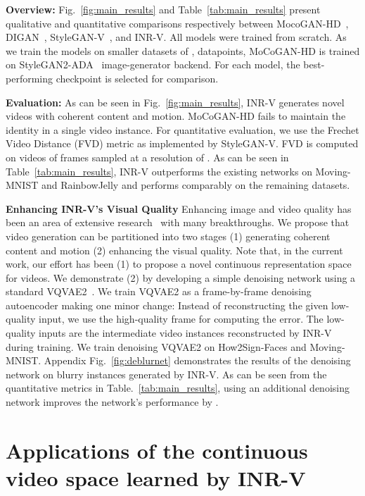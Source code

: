 \documentclass[10pt]{article} \usepackage[accepted]{tmlr}
\begin{document}
\textbf{Overview: } Fig.~\ref{fig:main_results} and Table~\ref{tab:main_results} present qualitative and quantitative comparisons respectively between MocoGAN-HD~\cite{mocogan-hd}, DIGAN~\cite{digan},  StyleGAN-V~\cite{stylegan-v}, and INR-V. 
All models were trained from scratch. 
As we train the models on smaller datasets of , datapoints, MoCoGAN-HD is trained on StyleGAN2-ADA~\cite{stylegan2-ada} image-generator backend. For each model, the best-performing checkpoint is selected for comparison. 

\textbf{Evaluation:} As can be seen in Fig.~\ref{fig:main_results}, INR-V generates novel videos with coherent content and motion. MoCoGAN-HD fails to maintain the identity in a single video instance. 
For quantitative evaluation, we use the Frechet Video Distance (FVD) metric as implemented by StyleGAN-V. FVD{} is computed on  videos of  frames sampled at a resolution of . As can be seen in Table~\ref{tab:main_results}, INR-V outperforms the existing networks on Moving-MNIST and RainbowJelly and performs comparably on the remaining datasets. 

\textbf{Enhancing INR-V's Visual Quality} 
Enhancing image and video quality has been an area of extensive research~\cite{gpen, tecogan, vrt, iseebetter} with many breakthroughs.
We propose that video generation can be partitioned into two stages (1) generating coherent content and motion (2) enhancing the visual quality. Note that, in the current work, our effort has been (1) to propose a novel continuous representation space for videos. 
We demonstrate (2) by developing a simple denoising network using a standard VQVAE2~\cite{vqvae2}. We train VQVAE2 as a frame-by-frame denoising autoencoder making one minor change: Instead of reconstructing the given low-quality input, we use the high-quality frame for computing the error. The low-quality inputs are the intermediate video instances reconstructed by INR-V during training. We train denoising VQVAE2 on How2Sign-Faces and Moving-MNIST. Appendix Fig.~\ref{fig:deblurnet} demonstrates the results of the denoising network on blurry instances generated by INR-V. 
As can be seen from the quantitative metrics in Table.~\ref{tab:main_results}, using an additional denoising network improves the network's performance by . 

\section{Applications of the continuous video space learned by INR-V }
\end{document}
